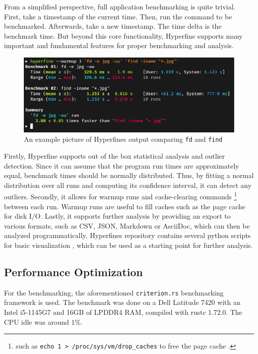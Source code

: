 From a simplified perspective, full application benchmarking is quite trivial. First, take a timestamp of the current time. Then, run the command to be benchmarked. Afterwards, take a new timestamp. The time delta is the benchmark time. But beyond this core functionality, Hyperfine supports many important and fundamental features for proper benchmarking and analysis.\\

\begin{figure}[H]
  \centering
  \includegraphics[width=\textwidth]{./assets/hyperfine.png}
  \caption{An example picture of Hyperfines output comparing \texttt{fd} and \texttt{find} \cite{hyperfine}}
\end{figure}

Firstly, Hyperfine supports out of the box statistical analysis and outlier detection. Since it can assume that the program run times are approximately equal, benchmark times should be normally distributed. Thus, by fitting a normal distribution over all runs and computing its confidence interval, it can detect any outliers. Secondly, it allows for warmup runs and cache-clearing commands \footnote{such as \texttt{echo 1 > /proc/sys/vm/drop\_caches} to free the page cache \cite{kernel}.} between each run. Warmup runs are useful to fill caches such as the page cache for disk I/O. Lastly, it supports further analysis by providing an export to various formats, such as CSV, JSON, Markdown or AsciiDoc, which can then be analyzed programmatically. Hyperfines repository contains several python scripts for basic visualization \cite{hyperfinescripts}, which can be used as a starting point for further analysis.

\subsection{Performance Optimization}
For the benchmarking, the aforementioned \texttt{criterion.rs} benchmarking framework is used. The benchmark was done on a Dell Latitude 7420 with an Intel i5-1145G7 and 16GB of LPDDR4 RAM, compiled with rustc 1.72.0. The CPU idle was around 1\%.

